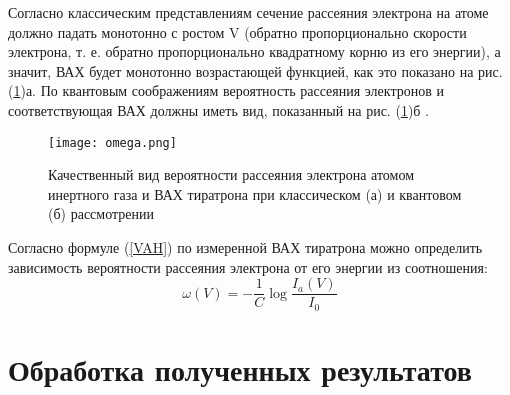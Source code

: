 \documentclass{physlab}
\begin{document}
Согласно классическим представлениям сечение рассеяния электрона на атоме должно падать монотонно с ростом V (обратно пропорционально скорости электрона, т. е. обратно пропорционально квадратному корню из его энергии), а значит, ВАХ будет монотонно возрастающей функцией, как это показано на рис. (\ref{omega})а. По квантовым соображениям вероятность рассеяния электронов и соответствующая ВАХ должны иметь вид, показанный на рис. (\ref{omega})б .

\begin{figure}[H] 
\centering
    \texttt{[image: omega.png]}
\caption{Качественный вид вероятности рассеяния электрона атомом инертного газа и ВАХ тиратрона при классическом (а) и квантовом (б) рассмотрении}
\label{omega}
\end{figure}


Согласно формуле (\ref{VAH}) по измеренной ВАХ тиратрона можно определить зависимость вероятности рассеяния электрона от его энергии из соотношения:
\begin{equation}
\omega(V) = -\frac{1}{C} \log\frac{I_a(V)}{I_0}
\end{equation}

\section{Обработка полученных результатов}
\end{document}
